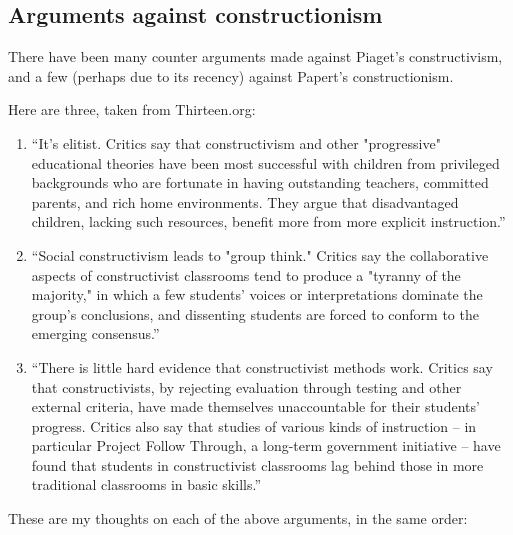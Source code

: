 \subsection{Arguments against constructionism}

There have been many counter arguments made against Piaget's constructivism, and a few (perhaps due to its recency) against Papert's constructionism.

Here are three, taken from Thirteen.org\cite{thirteen}:

\begin{enumerate}

\item ``It's elitist. Critics say that constructivism and other "progressive" educational theories have been most successful with children from privileged backgrounds who are fortunate in having outstanding teachers, committed parents, and rich home environments. They argue that disadvantaged children, lacking such resources, benefit more from more explicit instruction.''

\item ``Social constructivism leads to "group think." Critics say the collaborative aspects of constructivist classrooms tend to produce a "tyranny of the majority," in which a few students' voices or interpretations dominate the group's conclusions, and dissenting students are forced to conform to the emerging consensus.''

\item ``There is little hard evidence that constructivist methods work. Critics say that constructivists, by rejecting evaluation through testing and other external criteria, have made themselves unaccountable for their students' progress. Critics also say that studies of various kinds of instruction -- in particular Project Follow Through, a long-term government initiative -- have found that students in constructivist classrooms lag behind those in more traditional classrooms in basic skills.''

\end{enumerate} 

These are my thoughts on each of the above arguments, in the same order:

